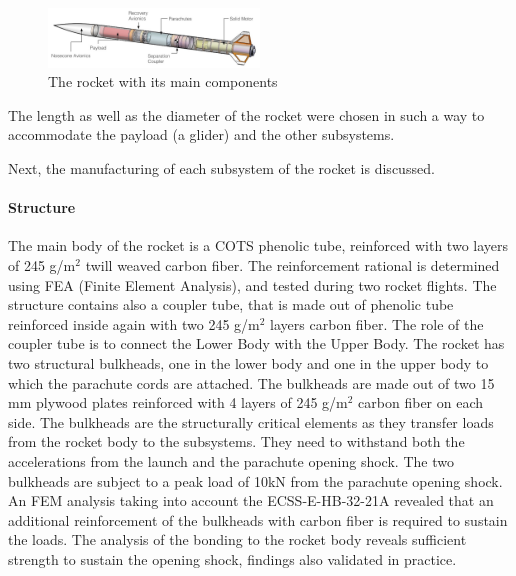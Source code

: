 \begin{figure}[h!]
\centering
\includegraphics[width=0.5\textwidth]{img/rocket_sw_annotated.jpg}
\caption{The rocket with its main components}
\label{f:rocket_adnoted}
\end{figure}


The length as well as the diameter of the rocket were chosen in such a way to accommodate the payload (a glider) and the other subsystems.

Next, the manufacturing of each subsystem of the rocket is discussed.


\paragraph{Structure}
\hfill \break
The main body of the rocket is a COTS phenolic tube, reinforced with two layers of 245 g/m$^2$ twill weaved carbon fiber. The reinforcement rational is determined using FEA (Finite Element Analysis), and tested during two rocket flights.
The structure contains also a coupler tube, that is made out of phenolic tube reinforced inside again with two 245 g/m$^2$ layers carbon fiber. The role of the coupler tube is to connect the Lower Body with the Upper Body.
The rocket has two structural bulkheads, one in the lower body and one in the upper body to which the parachute cords are attached. The bulkheads are made out of two 15 mm plywood plates reinforced with 4 layers of 245 g/m$^2$ carbon fiber on each side.  The bulkheads are the structurally critical elements as they transfer loads from the rocket body to the subsystems. They need to withstand both the accelerations from the launch and the parachute opening shock. 
The two bulkheads are subject to a peak load of 10kN from the parachute opening shock. An FEM analysis taking into account the  ECSS-E-HB-32-21A \cite{ecss} revealed that an additional reinforcement of the bulkheads with carbon fiber is required to sustain the loads. The analysis of the bonding to the rocket body reveals sufficient strength to sustain the opening shock, findings also validated in practice.



